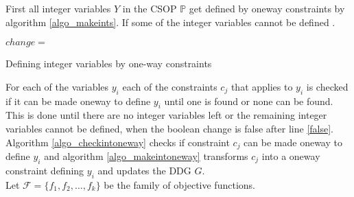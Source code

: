  
First all integer variables $Y$ in the CSOP $\mathbb{P}$  get 
defined by oneway constraints by algorithm \ref{algo_makeints}. If some of the integer variables cannot be defined 
. 
\\
\IncMargin{1em}
\begin{algorithm}[H]
\algdata 
{}
\BlankLine
\Bool $change = $ \true\;
\caption{Defining integer variables by one-way constraints}\label{algo_makeints}
\end{algorithm}\DecMargin{1em}
\noindent
For each of the variables $y_i$ each of the constraints $c_j$ that applies to $y_i$ is checked if it can be made oneway 
to define $y_i$ until one is found or none can be found. This is done until there are no integer variables left or the 
remaining integer variables cannot be defined, when the boolean change is false after line \ref{false}. Algorithm 
\ref{algo_checkintoneway} checks if constraint $c_j$ can be made oneway to define $y_i$ and algorithm 
\ref{algo_makeintoneway} transforms $c_j$ into a oneway constraint defining $y_i$ and updates the DDG $G$. \\
Let $\mathcal{F} = \{f_1,f_2,\dots ,f_k\}$ be the family of objective functions. \\
\IncMargin{1em}
